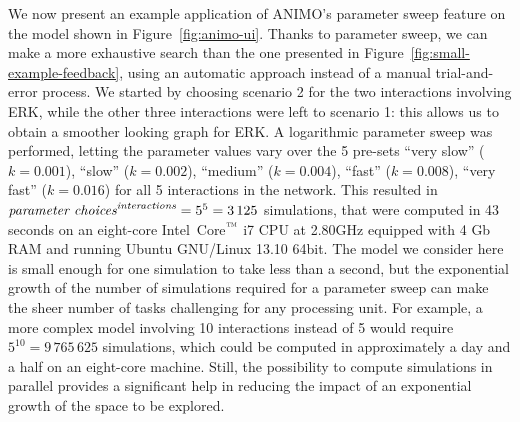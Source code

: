 \documentclass[submission,copyright,creativecommons]{eptcs}
\begin{document}
We now present an example application of ANIMO's parameter sweep feature on the model shown in Figure~\ref{fig:animo-ui}.
Thanks to parameter sweep, we can make a more exhaustive search than the one presented in Figure~\ref{fig:small-example-feedback},
using an automatic approach instead of a manual trial-and-error process.
We started by choosing scenario 2 for the two interactions involving ERK, while the other three interactions were left to scenario 1:
this allows us to obtain a smoother looking graph for ERK.
A logarithmic parameter sweep was performed, letting the parameter values
vary over the 5 pre-sets ``very slow'' ($k = 0.001$), ``slow'' ($k = 0.002$), ``medium'' ($k = 0.004$), ``fast'' ($k = 0.008$), ``very fast'' ($k = 0.016$)
for all 5 interactions in the network. This resulted in $\mbox{\it parameter choices}^{\mbox{\it\scriptsize interactions}} = 5 ^ 5 = 3\,125$ simulations, that were computed
in 43 seconds %
on an eight-core Intel\circledR\ Core$^{\mbox{\scriptsize\texttrademark}}$ i7 CPU at 2.80GHz equipped with 4 Gb RAM
and running Ubuntu GNU/Linux 13.10 64bit. The model we consider here is small enough for one simulation to take
less than a second, but the exponential growth of the number of simulations required for a parameter sweep
can make the sheer number of tasks challenging for any processing unit.
For example, a more complex model involving 10 interactions instead of 5 would require $5^{10} = 9\,765\,625$ simulations,
which could be computed in approximately a day and a half on an eight-core machine.
Still, the possibility to compute simulations in parallel provides a significant help in reducing
the impact of an exponential growth of the space to be explored.
\end{document}
